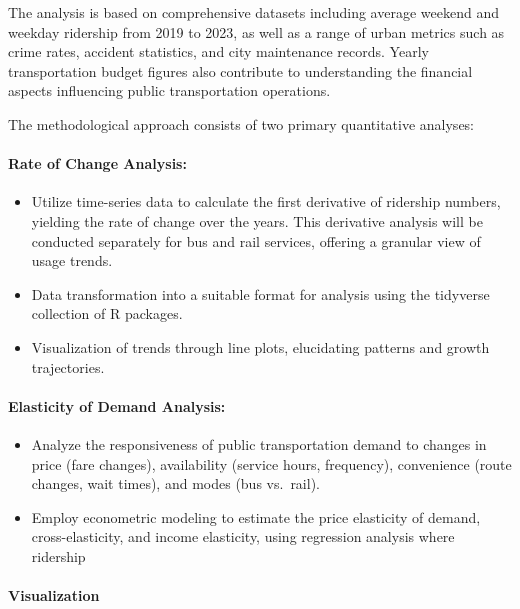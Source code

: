 \documentclass[
]{article}
\providecommand{\tightlist}{%
  \setlength{\itemsep}{0pt}\setlength{\parskip}{0pt}}
\begin{document}
The analysis is based on comprehensive datasets including average
weekend and weekday ridership from 2019 to 2023, as well as a range of
urban metrics such as crime rates, accident statistics, and city
maintenance records. Yearly transportation budget figures also
contribute to understanding the financial aspects influencing public
transportation operations.

The methodological approach consists of two primary quantitative
analyses:

\hypertarget{rate-of-change-analysis}{%
\paragraph{Rate of Change Analysis:}\label{rate-of-change-analysis}}

\begin{itemize}
\tightlist
\item
  Utilize time-series data to calculate the first derivative of
  ridership numbers, yielding the rate of change over the years. This
  derivative analysis will be conducted separately for bus and rail
  services, offering a granular view of usage trends.
\item
  Data transformation into a suitable format for analysis using the
  tidyverse collection of R packages.
\item
  Visualization of trends through line plots, elucidating patterns and
  growth trajectories.
\end{itemize}

\hypertarget{elasticity-of-demand-analysis}{%
\paragraph{Elasticity of Demand
Analysis:}\label{elasticity-of-demand-analysis}}

\begin{itemize}
\item
  Analyze the responsiveness of public transportation demand to changes
  in price (fare changes), availability (service hours, frequency),
  convenience (route changes, wait times), and modes (bus vs.~rail).
\item
  Employ econometric modeling to estimate the price elasticity of
  demand, cross-elasticity, and income elasticity, using regression
  analysis where ridership
\end{itemize}

\hypertarget{visualization}{%
\paragraph{Visualization}\label{visualization}}
\end{document}
